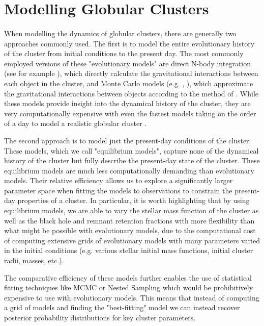 \section{Modelling Globular Clusters}

\paragraph{}


When modelling the dynamics of globular clusters, there are generally two approaches commonly used.
The first is to model the entire evolutionary history of the cluster from initial conditions to the
present day. The most commonly employed versions of these "evolutionary models" are direct N-body
integration (see for example \citealt{Baumgardt2017a}), which directly calculate the gravitational
interactions between each object in the cluster, and Monte Carlo models (e.g.
\citealt{Rodriguez2021}, \citealt{Hypki2013}), which approximate the gravitational interactions
between objects according to the method of \citet{Henon1971}. While these models provide insight
into the dynamical history of the cluster, they are very computationally expensive with even the
fastest models taking on the order of a day to model a realistic globular cluster
\citep{Rodriguez2021}.

The second approach is to model just the present-day conditions of the cluster. These models, which
we call "equilibrium models", capture none of the dynamical history of the cluster but fully
describe the present-day state of the cluster. These equilibrium models are much less
computationally demanding than evolutionary models. Their relative efficiency allows us to explore a
significantly larger parameter space when fitting the models to observations to constrain the
present-day properties of a cluster. In particular, it is worth highlighting that by using
equilibrium models, we are able to vary the stellar mass function of the cluster as well as the
black hole and remnant retention fractions with more flexibility than what might be possible with
evolutionary models, due to the computational cost of computing extensive grids of evolutionary
models with many parameters varied in the initial conditions (e.g. various stellar initial mass
functions, initial cluster radii, masses, etc.).

The comparative efficiency of these models further enables the use of statistical fitting techniques
like MCMC or Nested Sampling which would be prohibitively expensive to use with evolutionary models.
This means that instead of computing a grid of models and finding the "best-fitting" model we can
instead recover posterior probability distributions for key cluster parameters.


